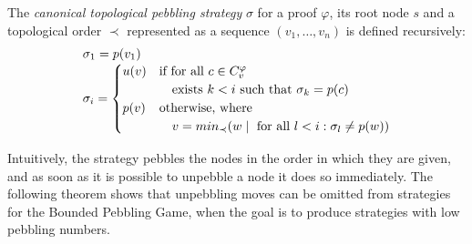 \begin{definition}
\label{def:canonstrat}
The \emph{canonical topological pebbling strategy} $\sigma$ for a proof $\varphi$, its root node $s$ and a topological order $\prec$ represented as a sequence $(v_1,\dots,v_n)$ is defined recursively:
$$
\begin{array}{l}
\sigma_1 = p(v_1) \\
\sigma_i = 
	\begin{cases}
		u(v) & \text{if for all } c \in C_{v}^{\varphi} \\
				 & \quad \text{exists } k < i \text { such that } \sigma_k = p(c)\\
		p(v) & \text{otherwise, where } \\
				 & \quad v = min_{\prec}(w \mid \text{ for all } l < i: \sigma_l \neq p(w))
	\end{cases}
\end{array}
$$
\end{definition}
Intuitively, the strategy pebbles the nodes in the order in which they are given, and as soon as it is possible to unpebble a node it does so immediately.
The following theorem shows that unpebbling moves can be omitted from strategies for the Bounded Pebbling Game, when the goal is to produce strategies with low pebbling numbers.

